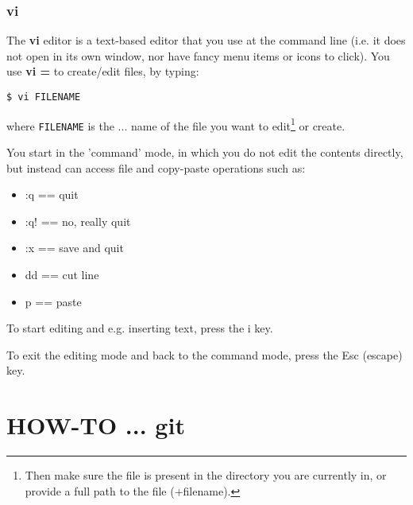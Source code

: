 \documentclass[11pt,fleqn]{book} %
\begin{document}
%
\subsubsection{vi}

The \textbf{vi} editor is a text-based editor that you use at the command line (i.e. it does not open in its own window, nor have fancy menu items or icons to click). You use \textbf{vi =} to create/edit files, by typing:

\begin{verbatim}
$ vi FILENAME
\end{verbatim}

\noindent where \texttt{FILENAME} is the ... name of the file you want to edit\footnote{Then make sure the file is present in the directory you are currently in, or provide a full path to the file (+filename).} or create.

You start in the 'command' mode, in which you do not edit the contents directly, but instead can access file and copy-paste operations such as:

\vspace{2mm}
\begin{itemize}[noitemsep]
\setlength{\itemindent}{.2in}
\item :q == quit
\item :q! == no, really quit
\item :x == save and quit
\item dd == cut line
\item p == paste
\end{itemize}
\vspace{2mm}

To start editing and e.g. inserting text, press the \textsf{i} key.

To exit the editing mode and back to the command mode, press the \textsf{Esc} (escape) key.


\newpage


\section{HOW-TO ... git}\label{how-to-git}
\vspace{2mm}

%
\end{document}
